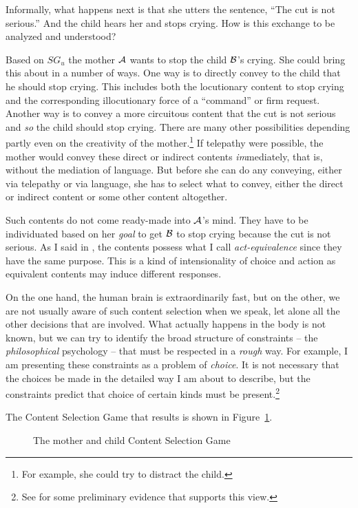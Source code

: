 Informally, what happens next is that she utters the sentence, ``The cut is not serious.'' And the child hears her and stops crying. How is this exchange to be analyzed and understood?

Based on $SG_u$ the mother $\cal A$ wants to stop the child $\cal B$'s crying. She could bring this about in a number of ways. One way is to directly convey to the child that he should stop crying. This includes both the locutionary content to stop crying and the corresponding illocutionary force of a ``command'' or firm request. Another way is to convey a more circuitous content that the cut is not serious and \emph{so} the child should stop crying. There are many other possibilities depending partly even on the creativity of the mother.\footnote{For example, she could try to distract the child.} If telepathy were possible, the mother would convey these direct or indirect contents \emph{im}mediately, that is, without the mediation of language. But before she can do any conveying, either via telepathy or via language, she has to select what to convey, either the direct or indirect content or some other content altogether.

Such contents do not come ready-made into $\cal A$'s mind. They have to be individuated based on her \emph{goal} to get $\cal B$ to stop crying because the cut is not serious. As I said in , the contents possess what I call \emph{act-equivalence} since they have the same purpose. This is a kind of intensionality of choice and action as equivalent contents may induce different responses.

On the one hand, the human brain is extraordinarily fast, but on the other, we are not usually aware of such content selection when we speak, let alone all the other decisions that are involved. What actually happens in the body is not known, but we can try to identify the broad structure of constraints -- the \emph{philosophical} psychology -- that must be respected in a \emph{rough} way. For example, I am presenting these constraints as a problem of \emph{choice}. It is not necessary that the choices be made in the detailed way I am about to describe, but the constraints predict that choice of certain kinds must be present.\footnote{See \citet{glimcher:dub} for some preliminary evidence that supports this view.} 

The Content Selection Game that results is shown in Figure~\ref{fig:content game}. 
\vfill
\begin{figure}[h] 
 
\caption{The mother and child Content Selection Game}
\label{fig:content game}
\end{figure}
\pagebreak

